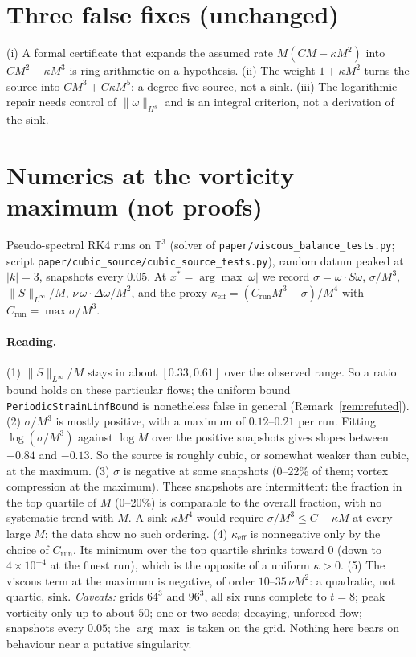 \documentclass[11pt]{article}
\theoremstyle{definition}
\theoremstyle{remark}
\begin{document}
\section{Three false fixes (unchanged)}
(i) A formal certificate that expands the assumed rate $M(CM-\kappa M^2)$ into $CM^2-\kappa M^3$ is ring arithmetic on a hypothesis. (ii) The weight $1+\kappa M^2$ turns the source into $CM^3+C\kappa M^5$: a degree-five source, not a sink. (iii) The logarithmic repair needs control of $\|\omega\|_{H^s}$ and is an integral criterion, not a derivation of the sink.

\section{Numerics at the vorticity maximum (not proofs)}
Pseudo-spectral RK4 runs on $\mathbb{T}^3$ (solver of \texttt{paper/viscous\_balance\_tests.py}; script \texttt{paper/cubic\_source/cubic\_source\_tests.py}), random datum peaked at $|k|=3$, snapshots every $0.05$. At $x^*=\arg\max|\omega|$ we record $\sigma=\omega\cdot S\omega$, $\sigma/M^3$, $\|S\|_{L^\infty}/M$, $\nu\,\omega\cdot\Delta\omega/M^2$, and the proxy $\kappa_{\mathrm{eff}}=(C_{\mathrm{run}}M^3-\sigma)/M^4$ with $C_{\mathrm{run}}=\max\sigma/M^3$.

\paragraph{Reading.} (1) $\|S\|_{L^\infty}/M$ stays in about $[0.33,0.61]$ over the observed range. So a ratio bound holds on these particular flows; the uniform bound \texttt{PeriodicStrainLinfBound} is nonetheless false in general (Remark~\ref{rem:refuted}). (2) $\sigma/M^3$ is mostly positive, with a maximum of $0.12$--$0.21$ per run. Fitting $\log(\sigma/M^3)$ against $\log M$ over the positive snapshots gives slopes between $-0.84$ and $-0.13$. So the source is roughly cubic, or somewhat weaker than cubic, at the maximum. (3) $\sigma$ is negative at some snapshots (0--22\% of them; vortex compression at the maximum). These snapshots are intermittent: the fraction in the top quartile of $M$ (0--20\%) is comparable to the overall fraction, with no systematic trend with $M$. A sink $\kappa M^4$ would require $\sigma/M^3\le C-\kappa M$ at every large $M$; the data show no such ordering. (4) $\kappa_{\mathrm{eff}}$ is nonnegative only by the choice of $C_{\mathrm{run}}$. Its minimum over the top quartile shrinks toward $0$ (down to $4\times10^{-4}$ at the finest run), which is the opposite of a uniform $\kappa>0$. (5) The viscous term at the maximum is negative, of order $10$--$35\,\nu M^2$: a quadratic, not quartic, sink. \emph{Caveats:} grids $64^3$ and $96^3$, all six runs complete to $t=8$; peak vorticity only up to about $50$; one or two seeds; decaying, unforced flow; snapshots every $0.05$; the $\arg\max$ is taken on the grid. Nothing here bears on behaviour near a putative singularity.
\end{document}
